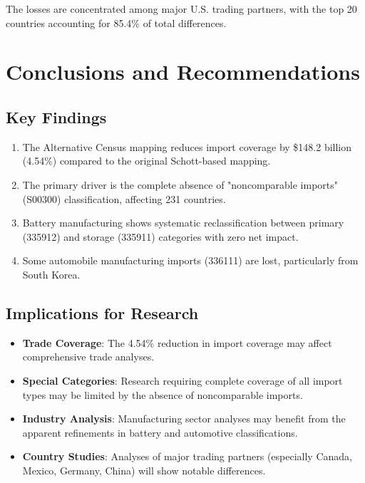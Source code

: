 \documentclass[11pt]{article}
\begin{document}
The losses are concentrated among major U.S. trading partners, with the top 20 countries accounting for 85.4\% of total differences.

\section{Conclusions and Recommendations}

\subsection{Key Findings}

\begin{enumerate}
\item The Alternative Census mapping reduces import coverage by \$148.2 billion (4.54\%) compared to the original Schott-based mapping.

\item The primary driver is the complete absence of "noncomparable imports" (S00300) classification, affecting 231 countries.

\item Battery manufacturing shows systematic reclassification between primary (335912) and storage (335911) categories with zero net impact.

\item Some automobile manufacturing imports (336111) are lost, particularly from South Korea.
\end{enumerate}

\subsection{Implications for Research}

\begin{itemize}
\item \textbf{Trade Coverage}: The 4.54\% reduction in import coverage may affect comprehensive trade analyses.

\item \textbf{Special Categories}: Research requiring complete coverage of all import types may be limited by the absence of noncomparable imports.

\item \textbf{Industry Analysis}: Manufacturing sector analyses may benefit from the apparent refinements in battery and automotive classifications.

\item \textbf{Country Studies}: Analyses of major trading partners (especially Canada, Mexico, Germany, China) will show notable differences.
\end{itemize}
\end{document}
